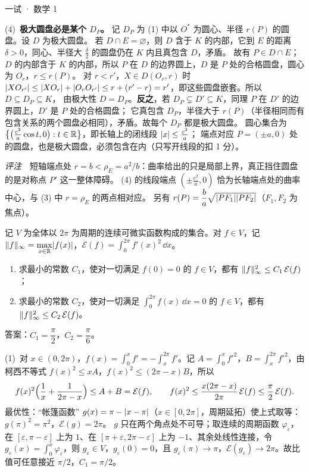 \documentclass[cjk=noto, seal=first]{mojing-exam}
\begin{document}
\begin{paper}[time={建议 3 小时（训练设置）}, full=150]{一试 · 数学 1}
\begin{questions}
\begin{solution}
(4)~\textbf{极大圆盘必是某个 $D_P$。} 记 $D_P$ 为 (1) 中以 $O^*$ 为圆心、半径 $r(P)$ 的圆盘。设 $D$ 为极大圆盘。
若 $D\cap E=\varnothing$，则 $D$ 含于 $K$ 的内部，它到 $E$ 的距离 $\delta>0$，同心、半径大 $\frac\delta2$ 的圆盘仍在 $K$ 内且真包含 $D$，矛盾。
故有 $P\in D\cap E$；$D$ 的内部含于 $K$ 的内部，所以 $P$ 在 $D$ 的边界圆上，$D$ 是 $P$ 处的合格圆盘，圆心为 $O_r$，$r\le r(P)$。
对 $r<r'$，$X\in D(O_r,r)$ 时 $\lvert XO_{r'}\rvert\le\lvert XO_r\rvert+\lvert O_rO_{r'}\rvert\le r+(r'-r)=r'$，即这些圆盘嵌套。所以 $D\subseteq D_P\subseteq K$，
由极大性 $D=D_P$。\textbf{反之}，若 $D_P\subsetneq D'\subseteq K$，同理 $P$ 在 $D'$ 的边界圆上，$D'$ 是 $P$ 处的合格圆盘；
它真包含 $D_P$，半径大于 $r(P)$（半径相同而有包含关系的两个圆盘必相同），矛盾。故每个 $D_P$ 都是极大圆盘。
圆心集合为 $\bigl\{\bigl(\frac{c^2}a\cos t,0\bigr):t\in\mathbb{R}\bigr\}$，即长轴上的闭线段 $\lvert x\rvert\le\frac{c^2}a$；
端点对应 $P=(\pm a,0)$ 处的圆盘，也是极大圆盘，必须包含在内（只写开线段的扣 1 分）。

\emph{评注}　短轴端点处 $r=b<\rho_E=a^2/b$：曲率给出的只是局部上界，真正挡住圆盘的是对称点 $P'$ 这一整体障碍。
(4) 的线段端点 $(\pm\frac{c^2}a,0)$ 恰为长轴端点处的曲率中心，与 (3) 中 $r=\rho_E$ 的两点相对应。
另有 $r(P)=\dfrac ba\sqrt{\lvert PF_1\rvert\lvert PF_2\rvert}$（$F_1,F_2$ 为焦点）。
\end{solution}

\question[20]
记 $V$ 为全体以 $2\pi$ 为周期的连续可微实函数构成的集合。对 $f\in V$，记
$\lVert f\rVert_\infty=\max\limits_{x\in\mathbb{R}}\lvert f(x)\rvert$，$\mathcal E(f)=\displaystyle\int_0^{2\pi}f'(x)^2\,\dd x$。
\begin{enumerate}
  \item 求最小的常数 $C_1$，使对一切满足 $f(0)=0$ 的 $f\in V$，都有 $\lVert f\rVert_\infty^2\le C_1\,\mathcal E(f)$；
  \item 求最小的常数 $C_2$，使对一切满足 $\displaystyle\int_0^{2\pi}f(x)\,\dd x=0$ 的 $f\in V$，都有
        $\lVert f\rVert_\infty^2\le C_2\,\mathcal E(f)$。
\end{enumerate}
\answerspace{2cm}
\begin{solution}
答案：$C_1=\dfrac\pi2$，$C_2=\dfrac\pi6$。

(1)~对 $x\in(0,2\pi)$，$f(x)=\int_0^xf'=-\int_x^{2\pi}f'$。记 $A=\int_0^xf'^2$，$B=\int_x^{2\pi}f'^2$，由柯西不等式
$f(x)^2\le xA$，$f(x)^2\le(2\pi-x)B$，所以
\[
  f(x)^2\Bigl(\frac1x+\frac1{2\pi-x}\Bigr)\le A+B=\mathcal E(f),\qquad
  f(x)^2\le\frac{x(2\pi-x)}{2\pi}\,\mathcal E(f)\le\frac\pi2\,\mathcal E(f).
\]
最优性：“帐篷函数” $g(x)=\pi-\lvert x-\pi\rvert$（$x\in[0,2\pi]$，周期延拓）使上式取等：$g(\pi)^2=\pi^2$，$\mathcal E(g)=2\pi$。
$g$ 只在两个角点处不可导；取连续的周期函数 $\varphi_\varepsilon$，在 $[\varepsilon,\pi-\varepsilon]$ 上为 $1$、在
$[\pi+\varepsilon,2\pi-\varepsilon]$ 上为 $-1$、其余处线性连接，令 $g_\varepsilon(x)=\int_0^x\varphi_\varepsilon$，则
$g_\varepsilon\in V$，$g_\varepsilon(0)=0$，且 $g_\varepsilon(\pi)\to\pi$，$\mathcal E(g_\varepsilon)\to2\pi$。故比值可任意接近
$\pi/2$，$C_1=\pi/2$。


\end{solution}
\end{questions}
\end{paper}
\end{document}
